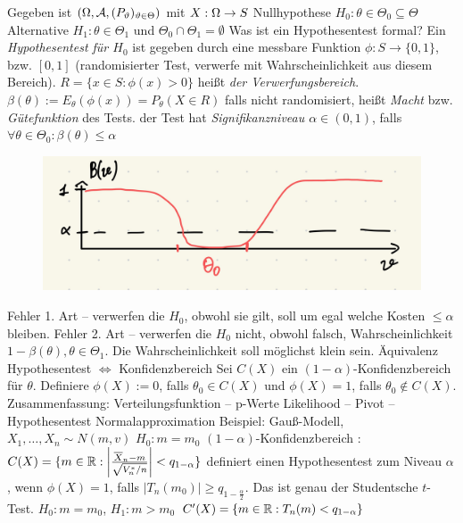 \begin{outline}
    \1 Gegeben ist $(\Omega, \mathcal{A}, (P_\vartheta)_{\vartheta\in\Theta})$ mit $ X:\Omega\rightarrow S$
        \2 Nullhypothese $H_0: \theta \in \Theta_0 \subseteq \Theta$
        \2 Alternative $H_1:\theta \in \Theta_1$ und $\Theta_0\cap \Theta_1 = \emptyset$
        \2 Was ist ein Hypothesentest formal?
            \3 Ein \emph{Hypothesentest für $H_0$} ist gegeben durch eine messbare Funktion $\phi:S\rightarrow \{0,1\}$, bzw. $[0,1]$ (randomisierter Test, verwerfe mit Wahrscheinlichkeit aus diesem Bereich).
            \3 $R=\{x\in S: \phi(x)>0\}$ heißt \emph{der Verwerfungsbereich}.
        \2 $\beta(\theta):=E_\theta(\phi(x)) = P_\theta(X\in R)$ falls nicht randomisiert, heißt \emph{Macht} bzw. \emph{Gütefunktion} des Tests.
        \2 der Test hat \emph{Signifikanzniveau $\alpha\in(0,1)$}, falls $\forall \theta\in\Theta_0: \beta(\theta)\leq \alpha$
        \begin{figure}
            \centering
            \includegraphics[width=0.5\linewidth]{IMG_1631.jpeg}
        \end{figure}
        \2 Fehler 1. Art -- verwerfen die $H_0$, obwohl sie gilt, soll um egal welche Kosten $\leq \alpha$ bleiben.
        \2 Fehler 2. Art -- verwerfen die $H_0$ nicht, obwohl falsch, Wahrscheinlichkeit $1-\beta(\theta), \theta \in \Theta_1$. Die Wahrscheinlichkeit soll möglichst klein sein.
    \1 Äquivalenz Hypothesentest $\iff$ Konfidenzbereich
        \2 Sei $C(X)$ ein $(1-\alpha)$-Konfidenzbereich für $\theta$. Definiere $\phi(X):= 0$, falls $\theta_0 \in C(X)$ und $\phi(X)=1$, falls $\theta_0 \not\in C(X)$.
    \1 Zusammenfassung:
        \2 Verteilungsfunktion -- p-Werte
        \2 Likelihood --
        \2 Pivot -- Hypothesentest
        \2 Normalapproximation
    \1 Beispiel: Gauß-Modell, $X_1,\ldots,X_n \sim N(m,v)$
        \2 $H_0: m=m_0$
        \2 $(1-\alpha)$-Konfidenzbereich : $C(X)=\{m\in\mathbb{R} : \left|\frac{\overline{X}_n-m}{\sqrt{V_n^* / n}}\right|<q_{1-\alpha}\}$
        definiert einen Hypothesentest zum Niveau $\alpha$, wenn $\phi(X)=1$, falls $|T_n(m_0)|\geq q_{1-\frac{\alpha}{2}}$. Das ist genau der Studentsche $t$-Test.
        \2 $H_0: m=m_0$, $H_1 : m>m_0$
        \2 $C'(X)=\{m\in\mathbb{R} : T_n(m) < q_{1-\alpha}\}$
\end{outline}

